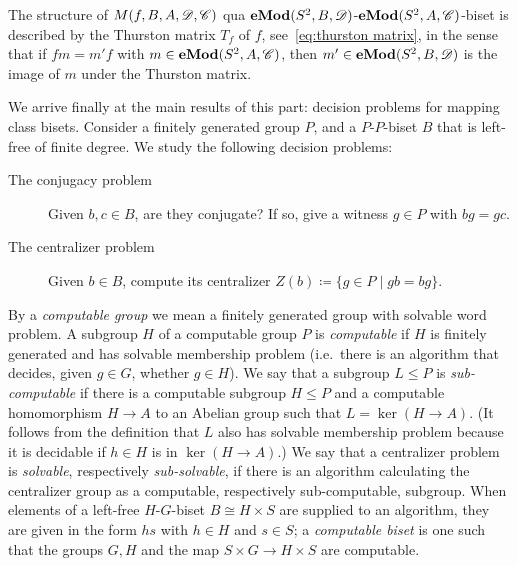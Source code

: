 \documentclass{amsart}
\begin{document}
The structure of $M(f,B,A,\DD,\CC)$ qua
$\Mod[e](S^2,B,\DD)$-$\Mod[e](S^2,A,\CC)$-biset is described by the
Thurston matrix $T_f$ of $f$, see~\eqref{eq:thurston matrix}, in the
sense that if $f m=m' f$ with $m\in\Mod[e](S^2,A,\CC)$, then
$m'\in\Mod[e](S^2,B,\DD)$ is the image of $m$ under the Thurston
matrix.

We arrive finally at the main results of this part: decision problems
for mapping class bisets. Consider a finitely generated group $P$, and
a $P$-$P$-biset $B$ that is left-free of finite degree. We study the
following decision problems:
\begin{description}
\item[The conjugacy problem] Given $b,c\in B$, are they conjugate? If
  so, give a witness $g\in P$ with $b g=g c$.
\item[The centralizer problem] Given $b\in B$, compute its centralizer
  $Z(b)\coloneqq\{g\in P\mid g b=b g\}$.
\end{description}
By a \emph{computable group} we mean a finitely generated group with
solvable word problem. A subgroup $H$ of a computable group $P$ is
\emph{computable} if $H$ is finitely generated and has solvable
membership problem (i.e.\ there is an algorithm that decides, given
$g\in G$, whether $g\in H$). We say that a subgroup $L\le P$ is
\emph{sub-computable} if there is a computable subgroup $H\le P$ and a
computable homomorphism $H\to A$ to an Abelian group such that
$L=\ker(H\to A)$. (It follows from the definition that $L$ also has
solvable membership problem because it is decidable if $h\in H$ is in
$\ker(H\to A)$.) We say that a centralizer problem is \emph{solvable},
respectively \emph{sub-solvable}, if there is an algorithm calculating
the centralizer group as a computable, respectively sub-computable,
subgroup. When elements of a left-free $H$-$G$-biset
$B\cong H\times S$ are supplied to an algorithm, they are given in the
form $h s$ with $h\in H$ and $s\in S$; a \emph{computable biset} is
one such that the groups $G,H$ and the map $S\times G\to H\times S$
are computable.
\end{document}
